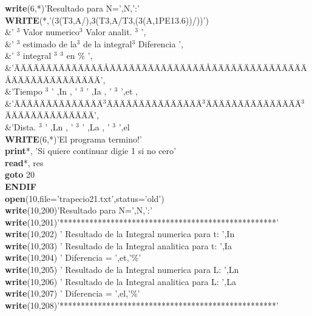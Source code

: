 \documentclass{article}
\begin{document}
 \textbf{write}(6,*)'Resultado para N=',N,':' \\
\textbf{WRITE}(*,'(3(T3,A/),3(T3,A/T3,(3(A,1PE13.6))/))') \\
\&' \ensuremath{^3} Valor numerico\ensuremath{^3} Valor analit. \ensuremath{^3} ', 
\\
\&' \ensuremath{^3} estimado de la\ensuremath{^3} de la integral\ensuremath{^3} Diferencia 
', \\
\&' \ensuremath{^3} integral \ensuremath{^3} \ensuremath{^3} en \% ', \\
\&'\"{A}\"{A}\"{A}\"{A}\"{A}\"{A}\"{A}\"{A}\"{A}\"{A}\"{A}\"{A}\"{A}\"{A}{\AA}\"{A}\"{A}\"{A}\"{A}\"{A}\"{A}\"{A}\"{A}\"{A}\"{A}\"{A}\"{A}\"{A}\"{A}\"{A}{\AA}\"{A}\"{A}\"{A}\"{A}\"{A}\"{A}\"{A}\"{A}\"{A}\"{A}\"{A}\"{A}\"{A}\"{A}\"{A}{\AA}\"{A}\"{A}\"{A}\"{A}\"{A}\"{A}\"{A}\"{A}\"{A}\"{A}\"{A}\"{A}\"{A}\"{A}', 
\\
\&'Tiempo \ensuremath{^3} ' ,In , ' \ensuremath{^3} ' ,Ia , ' \ensuremath{^3} ',et 
, \\
\&'\"{A}\"{A}\"{A}\"{A}\"{A}\"{A}\"{A}\"{A}\"{A}\"{A}\"{A}\"{A}\"{A}\"{A}\ensuremath{^3}\"{A}\"{A}\"{A}\"{A}\"{A}\"{A}\"{A}\"{A}\"{A}\"{A}\"{A}\"{A}\"{A}\"{A}\"{A}\ensuremath{^3}\"{A}\"{A}\"{A}\"{A}\"{A}\"{A}\"{A}\"{A}\"{A}\"{A}\"{A}\"{A}\"{A}\"{A}\"{A}\ensuremath{^3}\"{A}\"{A}\"{A}\"{A}\"{A}\"{A}\"{A}\"{A}\"{A}\"{A}\"{A}\"{A}\"{A}\"{A}', 
\\
\&'Dista. \ensuremath{^3} ' ,Ln , ' \ensuremath{^3} ' ,La , ' \ensuremath{^3} ',el 
\\
\textbf{WRITE}(6,*)'El programa termino!' \\
\textbf{print}*, 'Si quiere continuar digie 1 si no cero' \\
\textbf{read}*, res \\
\textbf{goto }20 \\
\textbf{ENDIF \\
open}(10,file='trapecio21.txt',status='old') \\
\textbf{write}(10,200)'Resultado para N=',N,':' \\
\textbf{write}(10,201)'***************************************************' 
\\
\textbf{write}(10,202) ' Resultado de la Integral numerica para t: 
',In \\
\textbf{write}(10,203) ' Resultado de la Integral analitica para t: 
',Ia \\
\textbf{write}(10,204) ' Diferencia = ',et,'\%' \\
\textbf{write}(10,205) ' Resultado de la Integral numerica para L: 
',Ln \\
\textbf{write}(10,206) ' Resultado de la Integral analitica para L: 
',La \\
\textbf{write}(10,207) ' Diferencia = ',el,'\%' \\
\textbf{write}(10,208)'***************************************************'
\end{document}
